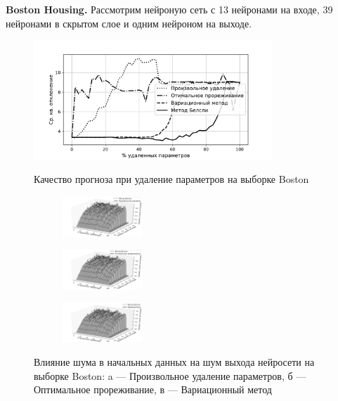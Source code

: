 \textbf{Boston Housing. } Рассмотрим нейроную сеть с 13 нейронами на входе, 39 нейронами в скрытом слое и одним нейроном на выходе.

\begin{figure}[h    !t]\center
\includegraphics[width=0.8\textwidth]{plots/grabovoy/boston_all.pdf}\\
\caption{Качество прогноза при удаление параметров на выборке Boston}
\label{BostonAll}
\end{figure}



\begin{figure}[ht]\center
\begin{subfigure}[а]{0.33\textwidth}
\includegraphics[width=0.33\textwidth]{plots/grabovoy/boston_random.pdf}
\end{subfigure}
\begin{subfigure}[б]{0.33\textwidth}
{\includegraphics[width=0.33\textwidth]{plots/grabovoy/boston_obd.pdf}}
\end{subfigure}
\begin{subfigure}[в]{0.33\textwidth}
{\includegraphics[width=0.33\textwidth]{plots/grabovoy/boston_var.pdf}}
\end{subfigure}

\caption{Влияние шума в начальных данных на шум выхода нейросети на выборке Boston: a --- Произвольное удаление параметров, б --- Оптимальное прореживание, в --- Вариационный метод}
\label{BostonNoise}
\end{figure}


